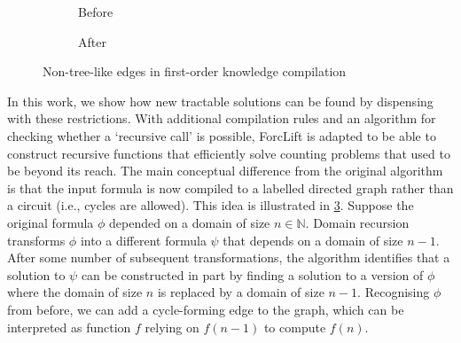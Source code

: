 \begin{figure}
  \centering
  \begin{subfigure}{0.49\textwidth}
    \caption{Before}
    \label{fig:before}
  \end{subfigure}
  \begin{subfigure}{0.49\textwidth}
    \centering
    \caption{After}
    \label{fig:after}
  \end{subfigure}
  \caption{Non-tree-like edges in first-order knowledge compilation}
\end{figure}


In this work, we show how new tractable solutions can be found by dispensing
with these restrictions. With additional compilation rules and an algorithm for
checking whether a `recursive call' is possible, ForcLift
\citep{DBLP:conf/ijcai/BroeckTMDR11} is adapted to be able to construct
recursive functions that efficiently solve counting problems that used to be
beyond its reach. The main conceptual difference from the original algorithm is
that the input formula is now compiled to a labelled directed graph rather than
a circuit (i.e., cycles are allowed). This idea is illustrated in
\cref{fig:after}. Suppose the original formula $\phi$ depended on a domain of
size $n \in \mathbb{N}$. Domain recursion transforms $\phi$ into a different
formula $\psi$ that depends on a domain of size $n-1$. After some number of
subsequent transformations, the algorithm identifies that a solution to $\psi$
can be constructed in part by finding a solution to a version of $\phi$ where
the domain of size $n$ is replaced by a domain of size $n-1$. Recognising $\phi$
from before, we can add a cycle-forming edge to the graph, which can be
interpreted as function $f$ relying on $f(n-1)$ to compute $f(n)$.

